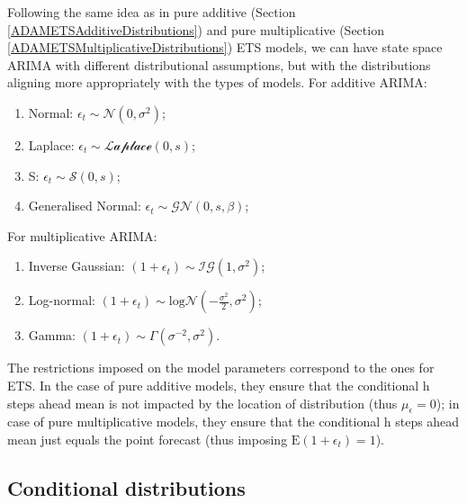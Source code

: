 \documentclass[]{book}
\providecommand{\tightlist}{%
  \setlength{\itemsep}{0pt}\setlength{\parskip}{0pt}}
\theoremstyle{definition}
\theoremstyle{definition}
\theoremstyle{definition}
\theoremstyle{definition}
\theoremstyle{remark}
\begin{document}
Following the same idea as in pure additive (Section \ref{ADAMETSAdditiveDistributions}) and pure multiplicative (Section \ref{ADAMETSMultiplicativeDistributions}) ETS models, we can have state space ARIMA with different distributional assumptions, but with the distributions aligning more appropriately with the types of models. For additive ARIMA:

\begin{enumerate}
\def\labelenumi{\arabic{enumi}.}
\tightlist
\item
  Normal: \(\epsilon_t \sim \mathcal{N}(0, \sigma^2)\);
\item
  Laplace: \(\epsilon_t \sim \mathcal{Laplace}(0, s)\);
\item
  S: \(\epsilon_t \sim \mathcal{S}(0, s)\);
\item
  Generalised Normal: \(\epsilon_t \sim \mathcal{GN}(0, s, \beta)\);
\end{enumerate}

For multiplicative ARIMA:

\begin{enumerate}
\def\labelenumi{\arabic{enumi}.}
\tightlist
\item
  Inverse Gaussian: \(\left(1+\epsilon_t \right) \sim \mathcal{IG}(1, \sigma^2)\);
\item
  Log-normal: \(\left(1+\epsilon_t \right) \sim \text{log}\mathcal{N}\left(-\frac{\sigma^2}{2}, \sigma^2\right)\);
\item
  Gamma: \(\left(1+\epsilon_t \right) \sim \mathcal{\Gamma}(\sigma^{-2}, \sigma^2)\).
\end{enumerate}

The restrictions imposed on the model parameters correspond to the ones for ETS. In the case of pure additive models, they ensure that the conditional h steps ahead mean is not impacted by the location of distribution (thus \(\mu_\epsilon=0\)); in case of pure multiplicative models, they ensure that the conditional h steps ahead mean just equals the point forecast (thus imposing \(\mathrm{E}(1+\epsilon_t)=1\)).

\hypertarget{conditional-distributions}{%
\subsection{Conditional distributions}\label{conditional-distributions}}
\end{document}

